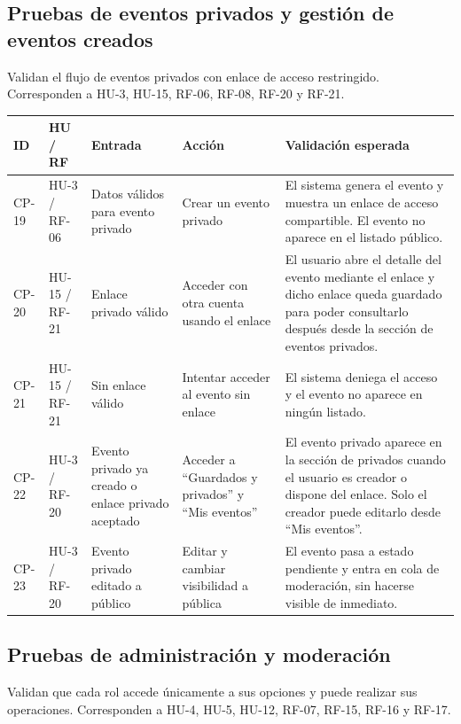 \subsection{Pruebas de eventos privados y gestión de eventos creados}

Validan el flujo de eventos privados con enlace de acceso restringido. Corresponden a HU-3, HU-15, RF-06, RF-08, RF-20 y RF-21.

\begin{longtable}{|L{1.3cm}|L{1.6cm}|L{3cm}|L{3.8cm}|L{4.3cm}|}
\hline
\textbf{ID} & \textbf{HU / RF} & \textbf{Entrada} & \textbf{Acción} & \textbf{Validación esperada} \\
\hline
{}\label{cp:19}CP-19 & HU-3 / RF-06 & Datos válidos para evento privado & Crear un evento privado & El sistema genera el evento y muestra un enlace de acceso compartible. El evento no aparece en el listado público. \\
\hline
{}\label{cp:20}CP-20 & HU-15 / RF-21 & Enlace privado válido & Acceder con otra cuenta usando el enlace & El usuario abre el detalle del evento mediante el enlace y dicho enlace queda guardado para poder consultarlo después desde la sección de eventos privados. \\
\hline
{}\label{cp:21}CP-21 & HU-15 / RF-21 & Sin enlace válido & Intentar acceder al evento sin enlace & El sistema deniega el acceso y el evento no aparece en ningún listado. \\
\hline
{}\label{cp:22}CP-22 & HU-3 / RF-20 & Evento privado ya creado o enlace privado aceptado & Acceder a ``Guardados y privados'' y ``Mis eventos'' & El evento privado aparece en la sección de privados cuando el usuario es creador o dispone del enlace. Solo el creador puede editarlo desde ``Mis eventos''. \\
\hline
{}\label{cp:23}CP-23 & HU-3 / RF-20 & Evento privado editado a público & Editar y cambiar visibilidad a pública & El evento pasa a estado pendiente y entra en cola de moderación, sin hacerse visible de inmediato. \\
\hline
\end{longtable}

\subsection{Pruebas de administración y moderación}

Validan que cada rol accede únicamente a sus opciones y puede realizar sus operaciones. Corresponden a HU-4, HU-5, HU-12, RF-07, RF-15, RF-16 y RF-17.

